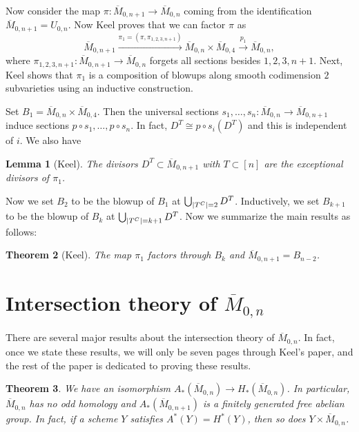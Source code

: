\documentclass[leqno, openany]{memoir}
\newtheorem{thm}{Theorem}[section]
\newtheorem{lem}[thm]{Lemma}
\theoremstyle{definition}
\theoremstyle{remark}
\theoremstyle{plain}
\theoremstyle{definition}
\theoremstyle{remark}
\newcommand{\ol}[1]{\overline{#1}}
\begin{document}
Now consider the map $\pi \colon \ol{M}_{0,n+1} \to \ol{M}_{0,n}$ coming from
the identification $\ol{M}_{0, n+1} = U_{0, n}$. Now Keel proves that we can
factor $\pi$ as \[ \ol{M}_{0,n+1} \xrightarrow{\pi_1 = (\pi, \pi_{1,2,3,n+1})}
\ol{M}_{0,n} \times \ol{M}_{0,4} \xrightarrow{p_1} \ol{M}_{0,n}, \] where
$\pi_{1,2,3,n+1} \colon \ol{M}_{0,n+1} \to \ol{M}_{0,n}$ forgets all sections
besides $1,2,3,n+1$. Next, Keel shows that $\pi_1$ is a composition of blowups
along smooth codimension $2$ subvarieties using an inductive construction.

Set $B_1 = \ol{M}_{0,n} \times \ol{M}_{0,4}$. Then the universal sections $s_1,
\ldots, s_n \colon \ol{M}_{0,n} \to \ol{M}_{0,n+1}$ induce sections $p \circ
s_1, \ldots, p \circ s_n$. In fact, $D^T \cong p \circ s_i(D^T)$ and this is
independent of $i$. We also have

\begin{lem}[Keel] The divisors $D^T \subset \ol{M}_{0,n+1}$ with $T \subset
[n]$ are the exceptional divisors of $\pi_1$.  \end{lem}

Now we set $B_2$ to be the blowup of $B_1$ at $\bigcup_{\abs{T^C}=2} D^T$.
Inductively, we set $B_{k+1}$ to be the blowup of $B_k$ at
$\bigcup_{\abs{T^C}=k+1} D^T$. Now we summarize the main results as follows:

\begin{thm}[Keel] The map $\pi_1$ factors through $B_k$ and $\ol{M}_{0,n+1} =
B_{n-2}$.  \end{thm}

\section{Intersection theory of $\ol{M}_{0,n}$}%
\label{sec:intersection_theory_of_m__0_n_}

There are several major results about the intersection theory of
$\ol{M}_{0,n}$. In fact, once we state these results, we will only be seven
pages through Keel's paper, and the rest of the paper is dedicated to proving
these results.

\begin{thm} We have an isomorphism $A_*(\ol{M}_{0,n}) \to H_*(\ol{M}_{0,n})$.
    In particular, $\ol{M}_{0,n}$ has no odd homology and $A_*(\ol{M}_{0,n+1})$
    is a finitely generated free abelian group. In fact, if a scheme $Y$
    satisfies $A^*(Y) = H^*(Y)$, then so does $Y \times \ol{M}_{0,n}$.
\end{thm}
\end{document}
